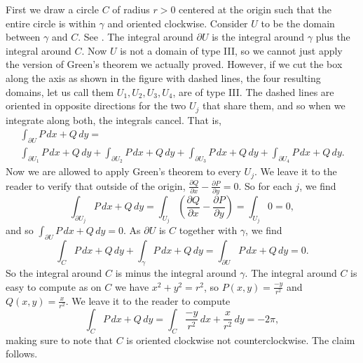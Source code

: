 \begin{example}
First we draw a circle $C$ of radius $r > 0$ centered at the origin such
that the entire circle is within $\gamma$ and oriented clockwise.
Consider $U$ to be the domain between $\gamma$ and $C$.
See .
The integral around $\partial U$ is the integral around $\gamma$ plus the
integral around $C$.
Now $U$ is not a domain of type III\@, so we cannot just apply the version of
Green's theorem we actually proved.
However, if we cut the box along the axis as shown in the figure with
dashed lines, the four resulting domains,
let us call them $U_1,U_2,U_3,U_4$,
are of type III\@.
The dashed lines are oriented in opposite directions
for the two $U_j$ that share them,
and so when we integrate along both,
 the integrals cancel.  That is,
\begin{multline*}
\int_{\partial U} P\, dx + Q \, dy
=
\\
\int_{\partial U_1} P\, dx + Q \, dy
+
\int_{\partial U_2} P\, dx + Q \, dy
+
\int_{\partial U_3} P\, dx + Q \, dy
+
\int_{\partial U_4} P\, dx + Q \, dy .
\end{multline*}
Now we are allowed to apply Green's theorem to every $U_j$.
We leave it to the reader to verify that outside of the origin,
$\frac{\partial Q}{\partial x} - \frac{\partial P}{\partial y} = 0$.
So for each $j$, we find
\begin{equation*}
\int_{\partial U_j} P\, dx + Q \, dy 
=
\int_{U_j} \left( \frac{\partial Q}{\partial x} - \frac{\partial P}{\partial
y} \right)
=
\int_{U_j} 0 = 0 ,
\end{equation*}
and so $\int_{\partial U} P\, dx + Q \, dy = 0$.
As $\partial U$ is $C$ together with $\gamma$, we find
\begin{equation*}
\int_C P \, dx + Q \, dy
+
\int_{\gamma} P \, dx + Q \, dy
=
\int_{\partial U} P \, dx + Q \, dy = 0 .
\end{equation*}
So the integral around $C$ is minus the integral around $\gamma$.  The
integral around $C$ is easy to compute as on $C$ we have $x^2+y^2 = r^2$,
so $P(x,y) = \frac{-y}{r^2}$ and $Q(x,y) = \frac{x}{r^2}$.
We leave it to the reader to compute
\begin{equation*}
\int_C P\, dx + Q \, dy
=
\int_C \frac{-y}{r^2}\, dx + \frac{x}{r^2} \, dy
=
- 2 \pi ,
\end{equation*}
making sure to note that $C$ is oriented clockwise not counterclockwise.
The claim follows.
\begin{myfigureht}
\end{myfigureht}
\end{example}
